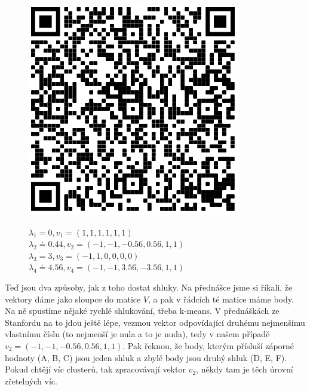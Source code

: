\begin{figure}[H]
\centering
\begin{minipage}{0.15\textwidth}
\centering
\includegraphics[width=\textwidth]{SAN/img/spectral-clustering-qr}
\end{minipage} \hfill
\begin{minipage}{0.84\textwidth}

$\lambda_1 = 0, v_1 = (1, 1, 1, 1, 1, 1)$\\
$\lambda_2 \doteq 0.44, v_2 = (-1, -1, -0.56, 0.56, 1, 1)$\\
$\lambda_3 = 3, v_3 = (-1, 1, 0, 0, 0, 0)$\\
$\lambda_4 \doteq 4.56, v_4 = (-1, -1, 3.56, -3.56, 1, 1)$\\


\end{minipage}
\end{figure}

Teď jsou dva způsoby, jak z toho dostat shluky. Na přednášce jsme si říkali, že vektory dáme jako sloupce do matice $V$, a pak v řádcích té matice máme body. Na ně spustíme nějaké rychlé shlukování, třeba k-means. V přednáškách ze Stanfordu na to jdou ještě lépe, vezmou vektor odpovídající druhému nejmenšímu vlastnímu číslu (to nejmenší je nula a to je nuda), tedy v našem případě $v_2 = (-1, -1, -0.56, 0.56, 1, 1)$. Pak řeknou, že body, kterým přísluší záporné hodnoty (A, B, C) jsou jeden shluk a zbylé body jsou druhý shluk (D, E, F). Pokud chtějí víc clusterů, tak zpracovávají vektor $v_2$, někdy tam je těch úrovní zřetelných víc.


